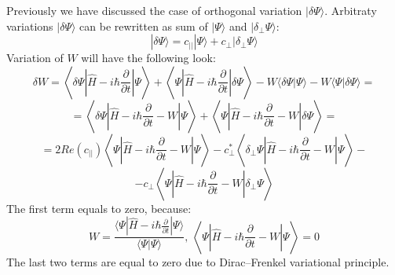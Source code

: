 Previously we have discussed the case of orthogonal variation $|\delta\Psi\rangle$. 
Arbitraty variations $|\delta\Psi\rangle$ can be rewritten as sum of $|\Psi\rangle$ and $|\delta_{\perp}\Psi\rangle$:
$$|\delta\Psi\rangle = c_{||}|\Psi\rangle + c_{\perp}|\delta_{\perp}\Psi\rangle$$
Variation of $W$ will have the following look:
$$\delta W = \left\langle\delta\Psi\left|\hat{H}-i\hbar\frac{\partial}{\partial t}\right|\Psi\right\rangle + %
	     \left\langle\Psi\left|\hat{H}-i\hbar\frac{\partial}{\partial t}\right|\delta\Psi\right\rangle - 
	     W\langle\delta\Psi|\Psi\rangle - W\langle\Psi|\delta\Psi\rangle = $$
$$ = \left\langle\delta\Psi\left|\hat{H}-i\hbar\frac{\partial}{\partial t}-W\right|\Psi\right\rangle + %
     \left\langle\Psi\left|\hat{H}-i\hbar\frac{\partial}{\partial t}-W\right|\delta\Psi\right\rangle = $$
$$ = 2\mathit{Re}(c_{||})\left\langle\Psi\left|\hat{H}-i\hbar\frac{\partial}{\partial t}-W\right|\Psi\right\rangle - %
     c_{\perp}^*\left\langle\delta_{\perp}\Psi\left|\hat{H}-i\hbar\frac{\partial}{\partial t}-W\right|\Psi\right\rangle - $$
$$ - c_{\perp}\left\langle\Psi\left|\hat{H}-i\hbar\frac{\partial}{\partial t}-W\right|\delta_{\perp}\Psi\right\rangle $$
The first term equals to zero, because:
$$W = \frac{\langle\Psi|\hat{H}-i\hbar\frac{\partial}{\partial t}|\Psi\rangle}{\langle\Psi|\Psi\rangle},\ %
      \left\langle\Psi\left|\hat{H}-i\hbar\frac{\partial}{\partial t}-W\right|\Psi\right\rangle = 0$$
The last two terms are equal to zero due to Dirac--Frenkel variational principle.


